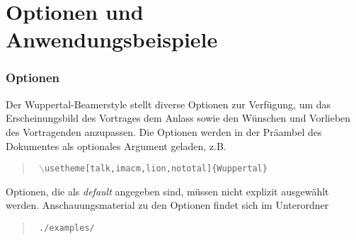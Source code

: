 \documentclass[12pt,rgb]{beamer}
\begin{document}
    \part{Optionen und Anwendungsbeispiele}
    \begin{frame}
        \partpage
    \end{frame}
    
    \section{Optionen}
    \begin{frame}
        \parbox{\textwidth}{Der Wuppertal-Beamerstyle stellt diverse Optionen zur Verfügung, um das Erscheinungsbild des
            Vortrages dem Anlass sowie den W\"unschen und Vorlieben des Vortragenden anzupassen. Die Optionen
            werden in der Pr\"aambel des Dokumentes als optionales Argument geladen, z.B.}
        \medskip
        \begin{quote} \tt
            $\backslash$usetheme[talk,imacm,lion,nototal]\{Wuppertal\}
        \end{quote}
        \medskip
        \parbox{\textwidth}{Optionen, die als \textit{default} angegeben sind, m\"ussen nicht explizit ausgew\"ahlt werden. Anschauungsmaterial zu den Optionen findet sich im Unterordner}
        \begin{quote}\tt
            ./examples/
        \end{quote}
    \end{frame}
    
\end{document}
